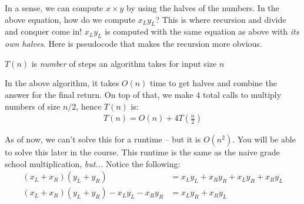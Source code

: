 \documentclass[14pt]{extarticle}
\begin{document}
    In a sense, we can compute $x \times y$ by using the halves of the numbers.
    In the above equation, how do we compute $x_L y_L$? This is where recursion
    and divide and conquer come in! $x_L y_L$ is computed with the same
    equation as above with \textit{its own halves}. Here is pseudocode that
    makes the recursion more obvious.
    \newcommand\mycommfont[1]{\footnotesize\ttfamily\textcolor{blue}{#1}}
    \begin{algorithm}
    \end{algorithm}

    \begin{definition}
        $T(n)$ is \textit{number} of steps an algorithm takes for input size $n$
    \end{definition}

    In the above algorithm, it takes $O(n)$ time to get halves and combine
    the answer for the final return. On top of that, we make $4$ total
    calls to multiply numbers of size $n/2$, hence $T(n)$ is:
    \begin{align*}
        T(n) = O(n) + 4T\left(\frac{n}{2}\right)
    \end{align*}

    As of now, we can't solve this for a runtime -- but it is $O(n^2)$. You
    will be able to solve this later in the course. This runtime is the same
    as the naive grade school multiplication, \textit{but...}
    Notice the following:
    \begin{align*}
        (x_L + x_R)(y_L + y_R) &= x_Ly_L + x_Ry_R + x_Ly_R + x_Ry_L\\
        (x_L + x_R)(y_L + y_R) - x_Ly_L - x_Ry_R &= x_Ly_R + x_Ry_L
    \end{align*}
  
\end{document}
